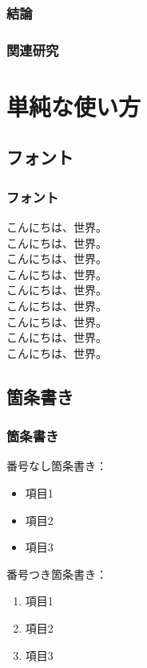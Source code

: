 \documentclass[dvipdfmx,cjk,xcolor=dvipsnames,envcountsect,notheorems,12pt]{beamer}
\theoremstyle{definition}
\begin{document}
\begin{frame}
	\frametitle{結論}
\end{frame}

\begin{frame}
	\frametitle{関連研究}
\end{frame}


\section{単純な使い方}

\subsection{フォント}

\begin{frame}
  \frametitle{フォント}
  {\scriptsize こんにちは、世界。}\\
  {\footnotesize こんにちは、世界。}\\
  {\small こんにちは、世界。}\\
  こんにちは、世界。\\%
  {\large こんにちは、世界。}\\
  {\Large こんにちは、世界。}\\
  {\LARGE こんにちは、世界。}\\
  {\Huge こんにちは、世界。}
  \vfill%
  \\%
  \alert{こんにちは、世界。}%
\end{frame}

\subsection{箇条書き}

\begin{frame}
  \frametitle{箇条書き}
  番号なし箇条書き：
  \begin{itemize}
  \item 項目1
  \item 項目2
  \item 項目3
  \end{itemize}
  番号つき箇条書き：
  \begin{enumerate}
  \item 項目1
  \item 項目2
  \item 項目3
  \end{enumerate}
\end{frame}
\end{document}
